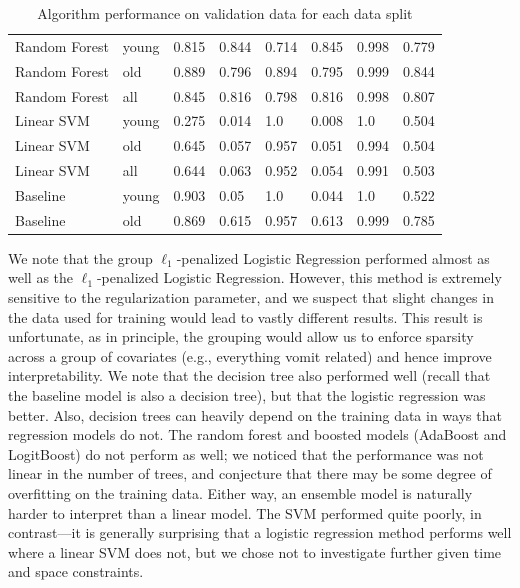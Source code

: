 \documentclass[11pt, letterpaper]{amsart}
\begin{document}
\begin{table}[h]
{\begin{tabular}{llllllll}
Random Forest  & young & 0.815 & 0.844    & 0.714       & 0.845       & 0.998 & 0.779             \\
Random Forest  & old   & 0.889 & 0.796    & 0.894       & 0.795       & 0.999 & 0.844             \\
Random Forest  & all   & 0.845 & 0.816    & 0.798       & 0.816       & 0.998 & 0.807             \\
Linear SVM            & young & 0.275 & 0.014    & 1.0         & 0.008       & 1.0   & 0.504             \\
Linear SVM            & old   & 0.645 & 0.057    & 0.957       & 0.051       & 0.994 & 0.504             \\
Linear SVM            & all   & 0.644 & 0.063    & 0.952       & 0.054       & 0.991 & 0.503             \\
Baseline       & young & 0.903 & 0.05     & 1.0         & 0.044       & 1.0   & 0.522             \\
Baseline       & old   & 0.869 & 0.615    & 0.957       & 0.613       & 0.999 & 0.785            
\end{tabular} }
\caption{Algorithm performance on validation data for each data split}\label{tab:val_performance}
\end{table}

We note that the group $\ell_1$-penalized Logistic Regression performed almost as well as the $\ell_1$-penalized Logistic Regression. However, this method is extremely sensitive to the regularization parameter, and we suspect that slight changes in the data used for training would lead to vastly different results. This result is unfortunate, as in principle, the grouping would allow us to enforce sparsity across a group of covariates (e.g., everything vomit related) and hence improve interpretability. We note that the decision tree also performed well (recall that the baseline model is also a decision tree), but that the logistic regression was better. Also, decision trees can heavily depend on the training data in ways that regression models do not. The random forest and boosted models (AdaBoost and LogitBoost) do not perform as well; we noticed that the performance was not linear in the number of trees, and conjecture that there may be some degree of overfitting on the training data. Either way, an ensemble model is naturally harder to interpret than a linear model. The SVM performed quite poorly, in contrast---it is generally surprising that a logistic regression method performs well where a linear SVM does not, but we chose not to investigate further given time and space constraints. 
\end{document}
